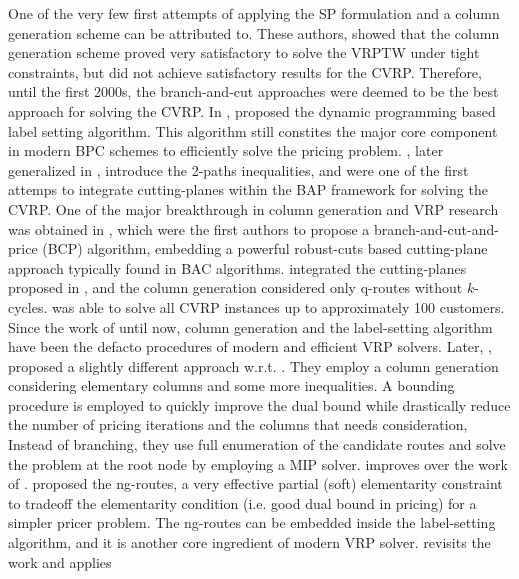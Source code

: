 One of the very few first attempts of applying
the SP formulation and a column generation scheme can
be attributed to\textcite{desrosiers1984, agarwal1989}.
These authors, showed that the column generation scheme proved
very satisfactory to solve the VRPTW under tight constraints,
but did not achieve satisfactory results for the CVRP.
Therefore, until the first 2000s, the branch-and-cut approaches were
deemed to be the best approach for solving the CVRP.
In \citeyear{desrochers1992}, \citeauthor{desrochers1992} proposed the dynamic programming
based label setting algorithm.
This algorithm still constites the major core component
in modern BPC schemes to efficiently solve the pricing problem.
\textcite{kohl1999}, later generalized in \cite{desaulniers2008}, introduce the
2-paths inequalities, and were one of the first attemps to integrate
cutting-planes within the BAP framework for solving the CVRP.
One of the major breakthrough in column generation and VRP research
was obtained in \textcite{fukasawa2006}, which were the
first authors to propose a branch-and-cut-and-price (BCP) algorithm,
embedding a powerful robust-cuts based cutting-plane approach
typically found in BAC algorithms.
\citeauthor{fukasawa2006} integrated the cutting-planes proposed in \cite{lysgaard2004},
and the column generation considered only q-routes without $k$-cycles.
\textcite{fukasawa2006} was able to solve all CVRP instances up to approximately 100 customers.
Since the work of \citeauthor{fukasawa2006} until now, column generation
and the label-setting algorithm have been the defacto procedures
of modern and efficient VRP solvers.
Later, \textcite{baldacci2008}, proposed a slightly different approach w.r.t. \citeauthor{fukasawa2006}.
They employ a column generation considering elementary columns and some more inequalities.
A bounding procedure is employed to quickly
improve the dual bound while drastically reduce the number
of pricing iterations and the columns that needs consideration,
Instead of branching, they use full enumeration of the candidate
routes and solve the problem at the root node by employing a MIP solver.
\textcite{pessoa2008a} improves over the work of \citeauthor{fukasawa2006}.
\textcite{baldacci2011} proposed the ng-routes, a very effective
partial (soft) elementarity constraint
to tradeoff the elementarity condition (i.e. good dual bound in pricing)
for a simpler pricer problem.
The ng-routes can be embedded inside the label-setting algorithm, and
it is another core ingredient of modern VRP solver.
\textcite{ropke2012} revisits the work \citeauthor{fukasawa2006} and applies
